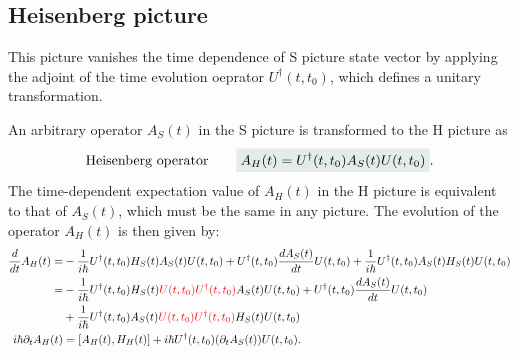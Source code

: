 \subsection{Heisenberg picture}
This picture vanishes the time dependence of S picture state vector by applying the adjoint of the time evolution oeprator $U^\dagger(t,t_0)$, which defines a unitary transformation.

An arbitrary operator $A_S(t)$ in the S picture is transformed to the H picture as 
\begin{align*}
    \text{Heisenberg operator}\qquad\highlight{A_H(t)=U^\dagger(t,t_0)A_S(t)U(t,t_0)}.
\end{align*}
The time-dependent expectation value of $A_H(t)$ in the H picture is equivalent to that of $A_S(t)$, which must be the same in any picture.
The evolution of the operator $A_H(t)$ is then given by:
\begin{align*}
    \frac{d}{dt}A_H(t)=&-\frac{1}{i\hbar}U^\dagger(t,t_0)H_S(t)A_S(t)U(t,t_0)+U^\dagger(t,t_0)\frac{dA_S(t)}{dt}U(t,t_0)+\frac{1}{i\hbar}U^\dagger(t,t_0)A_S(t)H_S(t)U(t,t_0)\\
    =&-\frac{1}{i\hbar}U^\dagger(t,t_0)H_S(t)\textcolor{red}{U(t,t_0)U^\dagger(t,t_0)}A_S(t)U(t,t_0)+U^\dagger(t,t_0)\frac{dA_S(t)}{dt}U(t,t_0)\\
    &+\frac{1}{i\hbar}U^\dagger(t,t_0)A_S(t)\textcolor{red}{U(t,t_0)U^\dagger(t,t_0)}H_S(t)U(t,t_0)\\
    i\hbar\partial_tA_H(t)&=[A_H(t),H_H(t)]+i\hbar U^\dagger(t,t_0)(\partial_tA_S(t))U(t,t_0).
\end{align*}

